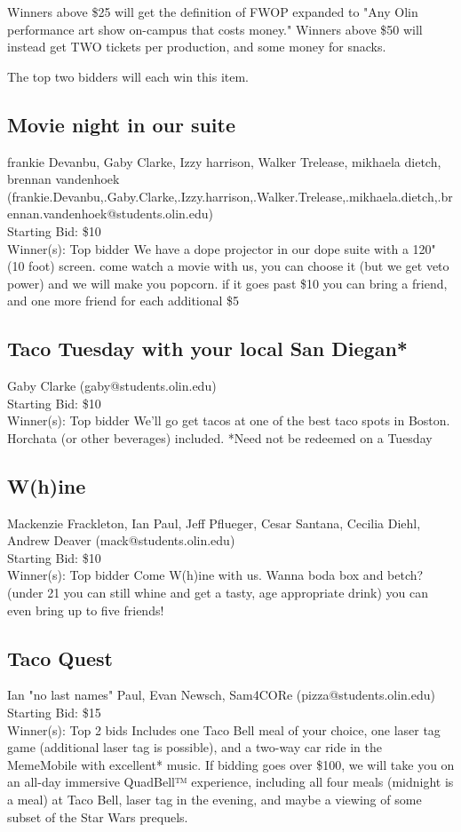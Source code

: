 \documentclass[11pt]{article}
\begin{document}
Winners above \$25 will get the definition of FWOP expanded to "Any Olin performance art show on-campus that costs money." 
Winners above \$50 will instead get TWO tickets per production, and some money for snacks.

The top two bidders will each win this item.
\subsection{Movie night in our suite}
frankie Devanbu, Gaby Clarke, Izzy harrison, Walker Trelease, mikhaela dietch, brennan vandenhoek (frankie.Devanbu,.Gaby.Clarke,.Izzy.harrison,.Walker.Trelease,.mikhaela.dietch,.brennan.vandenhoek@students.olin.edu) \\
Starting Bid: \$10 \\
Winner(s): 
Top bidder\newline
We have a dope projector in our dope suite with a 120" (10 foot) screen. come watch a movie with us, you can choose it (but we get veto power) and we will make you popcorn. if it goes past \$10 you can bring a friend, and one more friend for each additional \$5
\subsection{Taco Tuesday with your local San Diegan*}
Gaby Clarke (gaby@students.olin.edu) \\
Starting Bid: \$10 \\
Winner(s): 
Top bidder\newline
We'll go get tacos at one of the best taco spots in Boston. Horchata (or other beverages) included. *Need not be redeemed on a Tuesday
\subsection{W(h)ine}
Mackenzie Frackleton, Ian Paul, Jeff Pflueger, Cesar Santana, Cecilia Diehl, Andrew Deaver (mack@students.olin.edu) \\
Starting Bid: \$10 \\
Winner(s): 
Top bidder\newline
Come W(h)ine with us. Wanna boda box and betch? (under 21 you can still whine and get a tasty, age appropriate drink) you can even bring up to five friends!
\subsection{Taco Quest}
Ian "no last names" Paul, Evan Newsch, Sam4CORe (pizza@students.olin.edu) \\
Starting Bid: \$15 \\
Winner(s): 
Top 2 bids\newline
Includes one Taco Bell meal of your choice, one laser tag game (additional laser tag is possible), and a two-way car ride in the MemeMobile with excellent* music. If bidding goes over \$100, we will take you on an all-day immersive QuadBell™ experience, including all four meals (midnight is a meal) at Taco Bell, laser tag in the evening, and maybe a viewing of some subset of the Star Wars prequels.
\end{document}
